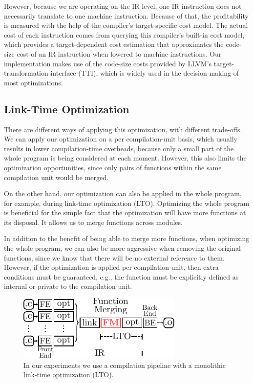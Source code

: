 However, because we are operating on the IR level, one IR instruction does not
necessarily translate to one machine instruction.
Because of that, the profitability is measured with the help of the compiler's
target-specific cost model.
The actual cost of each instruction comes from querying this compiler's built-in
cost model, which provides a target-dependent cost estimation that approximates
the code-size cost of an IR instruction when lowered to machine instructions.
Our implementation makes use of the code-size costs provided by LLVM's
target-transformation interface (TTI), which is widely used in the decision
making of most optimizations.

\subsection{Link-Time Optimization}

There are different ways of applying this optimization, with different trade-offs.
We can apply our optimization on a per compilation-unit basis, which usually
results in lower compilation-time overheads, because only a small part of the
whole program is being considered at each moment.
However, this also limits the optimization opportunities, since only pairs of
functions within the same compilation unit would be merged.

On the other hand, our optimization can also be applied in the whole program,
for example, during link-time optimization (LTO).
Optimizing the whole program is beneficial for the simple fact that the
optimization will have more functions at its disposal.
It allows us to merge functions across modules.

In addition to the benefit of being able to merge more functions, when optimizing
the whole program, we can also be more aggressive when removing the original functions,
since we know that there will be no external reference to them.
However, if the optimization is applied per compilation unit, then extra
conditions must be guaranteed, e.g., the function must be explicitly defined
as internal or private to the compilation unit.

\begin{figure}[t!]
  \centering
  \includegraphics[width=0.7\linewidth]{figs/opt-pipeline.pdf}
  \caption{In our experiments we use a compilation pipeline with a monolithic link-time optimization (LTO).}
  \label{fig:opt-pipeline}
\end{figure}


